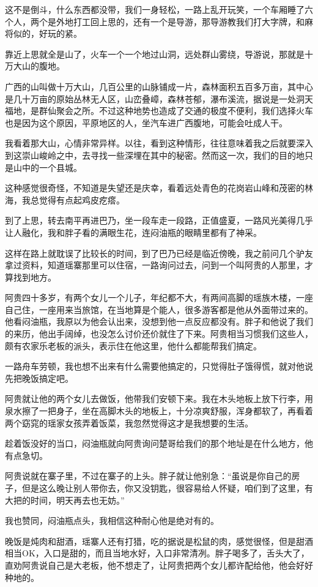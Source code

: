 这不是倒斗，什么东西都没带，我们一身轻松，一路上乱开玩笑，一个车厢睡了六个人，两个是外地打工回上思的，还有一个是导游，那导游教我们打大字牌，和麻将似的，好玩的紧。

靠近上思就全是山了，火车一个一个地过山洞，远处群山雾绕，导游说，那就是十万大山的腹地。

广西的山叫做十万大山，几百公里的山脉铺成一片，森林面积五百多万亩，其中心是几十万亩的原始丛林无人区，山峦叠嶂，森林苍郁，瀑布溪流，据说是一处洞天福地，是群仙聚会之所。不过这种地势也造成了交通的极度不便利，我们选择火车也是因为这个原因，平原地区的人，坐汽车进广西腹地，可能会吐成人干。

我看着那大山，心情非常异样。以往，看到这种情形，往往意味着我之后就要深入到这崇山峻岭之中，去寻找一些深埋在其中的秘密。然而这一次，我们的目的地只是山中的一个县城。

这种感觉很奇怪，不知道是失望还是庆幸，看着远处青色的花岗岩山峰和茂密的林海，我总觉得有点起鸡皮疙瘩。

到了上思，转去南平再进巴乃，坐一段车走一段路，正值盛夏，一路风光美得几乎让人融化，我和胖子看的满眼生花，连闷油瓶的眼睛里都有了神采。

这样在路上就耽误了比较长的时间，到了巴乃已经是临近傍晚，我之前问几个驴友拿过资料，知道瑶寨那里可以住宿，一路询问过去，问到一个叫阿贵的人那里，才算找到地方。

阿贵四十多岁，有两个女儿一个儿子，年纪都不大，有两间高脚的瑶族木楼，一座自己住，一座用来当旅馆，在当地算是个能人，很多游客都是他从外面带过来的。他看闷油瓶，我原以为他会认出来，没想到他一点反应都没有。胖子和他说了我们的来历，他出手阔绰，也没怎么讨价还价就住了下来。阿贵相当习惯我们这些人，颇有农家乐老板的派头，表示住在他这里，他什么都能帮我们搞定。

一路舟车劳顿，我也想不出来有什么需要他搞定的，只觉得肚子饿得慌，就对他说先把晚饭搞定吧。

阿贵就让他的两个女儿去做饭，他带我们安顿下来。我在木头地板上放下行李，用泉水擦了一把身子，坐在高脚木头的地板上，十分凉爽舒服，浑身都软了，再看着两个窈窕的瑶家女孩弄着饭菜，我忽然觉得这才是我想要的生活。

趁着饭没好的当口，闷油瓶就向阿贵询问楚哥给我们的那个地址是在什么地方，他有点急切。

阿贵说就在寨子里，不过在寨子的上头。胖子就让他别急：“虽说是你自己的房子，但是这么晚让别人带你去，你又没钥匙，很容易给人怀疑，咱们到了这里，有大把的时间，明天再去也无妨。”

我也赞同，闷油瓶点头，我相信这种耐心他是绝对有的。

晚饭是炖肉和甜酒，瑶寨人还有打猎，吃的据说是松鼠的肉，感觉很怪，但是甜酒相当OK，入口是甜的，而且当地水好，入口非常清冽。胖子喝多了，舌头大了，直劝阿贵说自己是大老板，他不想走了，让阿贵把两个女儿都许配给他，他会好好种地的。


